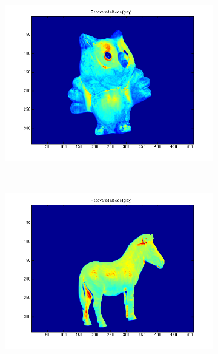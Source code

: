 \documentclass{paper}
\begin{document}
\begin{figure}[h!]
     \begin{subfigure}{0.3\textwidth}
        \includegraphics[width=\textwidth]{results/owl/owl_rec_a}
    \end{subfigure}
    ~
    \begin{subfigure}{0.3\textwidth}
        \includegraphics[width=\textwidth]{results/horse/horse_rec_a}
    \end{subfigure}
    ~
    \begin{subfigure}{0.3\textwidth}

\end{subfigure}
\end{figure}
\end{document}
